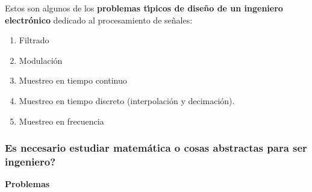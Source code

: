  Estos son algunos de los \textbf{problemas t\'{\i}picos de
   dise\~{n}o de un ingeniero electr\'{o}nico} dedicado al
 procesamiento de se\~{n}ales:
 \begin{enumerate}
 \item Filtrado
 \item Modulaci\'{o}n
 \item Muestreo en tiempo continuo
 \item Muestreo en tiempo discreto (interpolaci\'{o}n y
   decimaci\'{o}n).
 \item Muestreo en frecuencia
 \end{enumerate}

 \subsubsection{\textquestiondown Es necesario estudiar matem\'{a}tica
   o cosas abstractas para ser ingeniero?}

 \textbf{Problemas}

